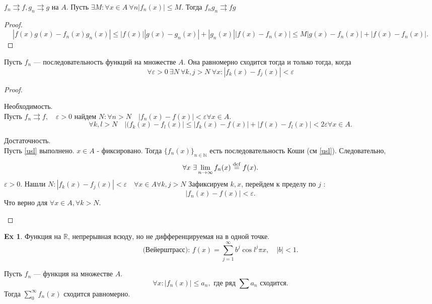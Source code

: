 \documentclass[11pt]{book}
\newcommand{\N}{\mathbb{N}}
\newcommand{\R}{\mathbb{R}}
\newcommand{\slim}{\sum\limits}
\renewcommand{\le}{\leqslant}
\def\mydef{\mathrel{\stackrel{\rm def}=}}
\theoremstyle{definition}
\theoremstyle{plain}
\theoremstyle{plain}
\theoremstyle{definition}
\newtheorem*{ex}{Ex}
\theoremstyle{remark}
\begin{document}
\begin{thm}
    $f_n \rightrightarrows  f, g_n \rightrightarrows  g$ на $A$.
    Пусть $\exists M: \forall x \in A ~\forall  n |f_n(x) | \le  M$. Тогда  $f_n g_n \rightrightarrows fg$
\end{thm}
\begin{proof}
    \[
	|f(x) g(x) - f_n(x) g_n(x)| \le  |f(x) ||g(x) - g_n(x) | + | g_n(x)| |f(x) - f_n(x)| \le  M | g(x) - f_n(x)  |+ | f(x) - f_n(x)|
    .\]
\end{proof}
\begin{thm}
    Пусть $f_n$ --- последовательность функций на множестве $A$. Она равномерно сходится  тогда и только тогда, когда
    \begin{equation}
	\label{usl}
	\forall  \varepsilon >0~ \exists  N ~ \forall  k, j> N~ \forall x : |f_k(x) - f_j(x)| < \varepsilon
    \end{equation}
\end{thm}
\begin{proof}
    $ $
    \begin{description}
	\item Необходимость.\\
    Пусть $f_n \rightrightarrows  f, \quad \varepsilon  >0$ найдем $N: \forall  n > N \quad |f_n(x) - f(x)| < \varepsilon  \forall x\in A$.
    \[
	\forall k, l > N \quad |(f_k(x) - f_l(x)| \le |f_k(x) -f(x)| + |f(x) - f_l(x)| < 2 \varepsilon  \forall x \in A
    .\]
\item Достаточность.\\
    Пусть  \ref{usl} выполнено. $x \in A$ - фиксировано.
    Тогда $\{f_n(x)\}_{n \in  \N}$ есть последовательность Коши (см \ref{usl}). Следовательно,
    \[
	\forall  x~ \exists \lim_{n \to  \infty} f_n(x) \mydef  f(x)
    .\]
    $ \varepsilon  >0$. Нашли $N: |f_k(x) - f_j(x)| < \varepsilon  \quad \forall  x \in A \forall  k, j > N$
    Зафиксируем $k, x$, перейдем к пределу по $j$ :
    \[
	|f_n(x) - f(x) | < \varepsilon
    .\]
    Что верно для $ \forall  x \in  A, \forall  k > N$.
    \end{description}
\end{proof}
\begin{ex}
    Функция на $\R$, непрерывная всюду, но не дифференцируемая на в одной точке.
    \[
	\text{(Вейерштрасс): } f(x) = \slim_{j=1}^{\infty} b^{ j} \cos l^{j} \pi x, \quad |b| < 1
    .\]
\end{ex}
\begin{thm}[Вейерштрасс]
    Пусть $f_n$ --- функция на множестве $A$.
    \[
	\forall  x : |f_n(x)| \le a_n, \text{ где ряд } \slim a_n \text{ сходится}
    .\]
    Тогда $\slim_0^{\infty} f_n(x) $ сходится равномерно.
\end{thm}
\end{document}
